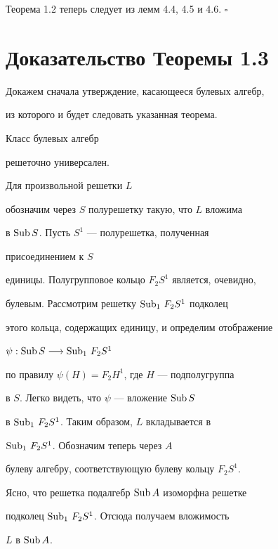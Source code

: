Теорема 1.2 теперь следует из лемм 4.4, 4.5 и 4.6. $\square$





\section{Доказательство Теоремы 1.3}





Докажем сначала утверждение, касающееся булевых алгебр,


из которого и будет следовать указанная теорема.





\begin{propm} Класс булевых алгебр


решеточно универсален.


\end{propm}





\begin{pf} Для произвольной решетки $L$


обозначим через $S$ полурешетку такую, что $L$ вложима


в $\operatorname{Sub} S$. Пусть $S^1$ --- полурешетка, полученная


присоединением к $S$


единицы. Полугрупповое кольцо $F_2S^1$ является, очевидно,


булевым. Рассмотрим решетку $\operatorname{Sub}_1\, F_2S^1$ подколец


этого кольца, содержащих единицу, и определим отображение


$\psi: \operatorname{Sub} S \longrightarrow \operatorname{Sub}_1\,F_2S^1$


по правилу $\psi(H) = F_2H^1$, где $H$ --- подполугруппа


в $S$. Легко видеть, что $\psi$ --- вложение $\operatorname{Sub} S$


в $\operatorname{Sub}_1\,F_2S^1$. Таким образом, $L$ вкладывается в


$\operatorname{Sub}_1\,F_2S^1$. Обозначим теперь через $A$


булеву алгебру, соответствующую булеву кольцу $F_2S^1$.


Ясно, что решетка подалгебр $\operatorname{Sub} A$ изоморфна решетке


подколец $\operatorname{Sub}_1\,F_2S^1$. Отсюда получаем вложимость


$L$ в $\operatorname{Sub} A$.


\end{pf}





